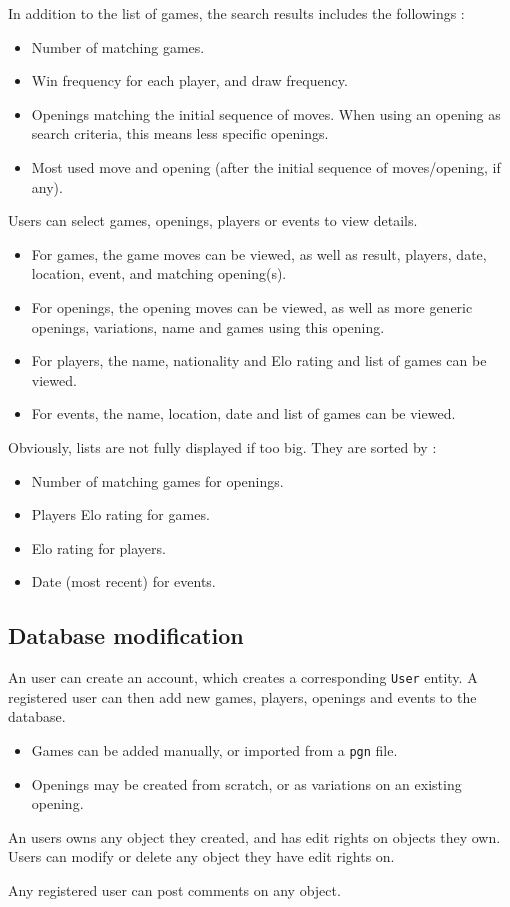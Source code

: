 \documentclass{article}
\begin{document}
In addition to the list of games, the search results includes the followings :
\begin{itemize}[noitemsep]
\item Number of matching games.
\item Win frequency for each player, and draw frequency.
\item Openings matching the initial sequence of moves.
When using an opening as search criteria, this means less specific openings.
\item Most used move and opening (after the initial sequence of moves/opening, if any).
\end{itemize}

Users can select games, openings, players or events to view details.
\begin{itemize}
\item For games, the game moves can be viewed, as well as result, players, date, location, event,
and matching opening(s).
\item For openings, the opening moves can be viewed, as well as more generic openings, variations, name
and games using this opening.
\item For players, the name, nationality and Elo rating and list of games can be viewed.
\item For events, the name, location, date and list of games can be viewed.
\end{itemize}

Obviously, lists are not fully displayed if too big.
They are sorted by :
\begin{itemize}[noitemsep]
\item Number of matching games for openings.
\item Players Elo rating for games.
\item Elo rating for players.
\item Date (most recent) for events.
\end{itemize}


\subsection{Database modification}
An user can create an account, which creates a corresponding \verb|User| entity.
A registered user can then add new games, players, openings and events to the database.
\begin{itemize}
\item Games can be added manually, or imported from a \verb|pgn| file.
\item Openings may be created from scratch, or as variations on an existing opening.
\end{itemize}

An users owns any object they created, and has edit rights on objects they own.
Users can modify or delete any object they have edit rights on.

Any registered user can post comments on any object.
\end{document}
